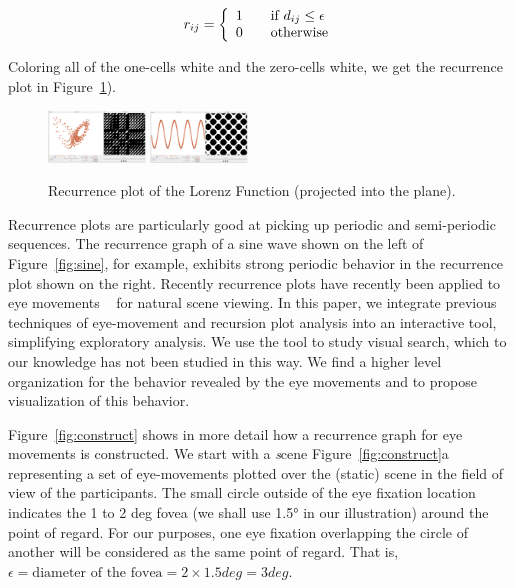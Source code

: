 \documentclass{sigchi}
\begin{document}
\[ 
r_{ij} = \left\{
	\begin{array}{l l} 
    1  & \quad \text{if $d_{ij} \leq \epsilon$}\\ 
    0  & \quad \text{otherwise} 
    \end{array} \right. 
\]

Coloring all of the one-cells white and the zero-cells white, we get
the recurrence plot in Figure~\ref{fig:lorenz}).

\begin{figure}
	\includegraphics[width=0.23\textwidth]{figures/lorenz.pdf}\qquad
	\includegraphics[width=0.23\textwidth]{figures/sine.pdf}
	\caption{Recurrence plot of the Lorenz Function (projected into the
		plane).\label{fig:lorenz}}
\end{figure}


Recurrence plots are particularly good at picking up
periodic and semi-periodic sequences. The recurrence graph of a sine wave
shown on the left of Figure~\ref{fig:sine}, for example, exhibits strong
periodic behavior in the recurrence plot shown on the right. Recently
recurrence plots have recently been applied to eye movements
~\cite{Anderson_2013} for natural scene viewing. In this paper, we integrate previous
techniques of eye-movement and recursion plot analysis into an interactive
tool, simplifying exploratory analysis. We use the tool to study visual
search, which to our knowledge has not been studied in this way. 
We find  a higher level organization for the behavior revealed by 
the eye movements and to propose visualization of this behavior.  


Figure~\ref{fig:construct} shows in more detail how a recurrence graph for eye
movements is constructed. We start with a {\emph scene} Figure~\ref{fig:construct}a
representing  a set of eye-movements plotted over the (static) scene in the
field of view of the participants. The small circle outside of the eye
fixation location indicates the 1 to 2 deg fovea (we shall use 1.5° in our
illustration) around the point of regard. For our purposes, one eye
fixation overlapping the circle of another will be considered as the same
point of regard. That is, $\epsilon = \text{diameter of the fovea} = 2
\times 1.5 deg = 3 deg $. 
\end{document}
